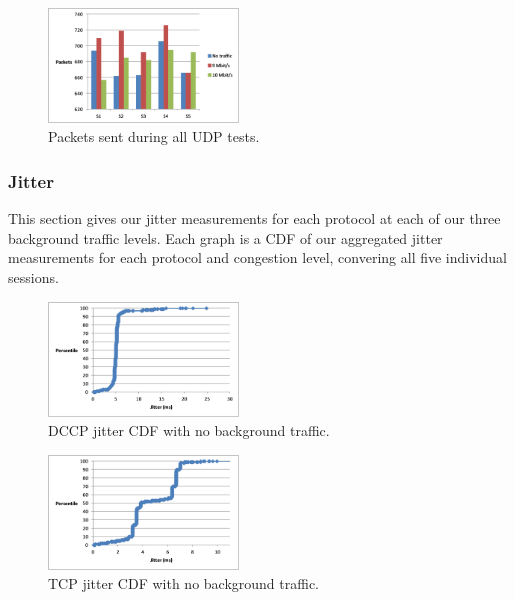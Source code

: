 \begin{figure}[!h]
   \centering
      \includegraphics[width=0.45\textwidth]{pics/udp_sent}
   \caption{Packets sent during all UDP tests.}
\label{fig:udp_sent}
\end{figure}

\subsubsection{Jitter}

This section gives our jitter measurements for each protocol at each of our
three background traffic levels. Each graph is a CDF of our aggregated jitter
measurements for each protocol and congestion level, convering all five
individual sessions.

\begin{figure}[!h]
   \centering
      \includegraphics[width=0.45\textwidth]{pics/dccp_none_jitter}
   \caption{DCCP jitter CDF with no background traffic.}
\label{fig:dccp_none_jitter}
\end{figure}

\begin{figure}[!h]
   \centering
      \includegraphics[width=0.45\textwidth]{pics/tcp_none_jitter}
   \caption{TCP jitter CDF with no background traffic.}
\label{fig:tcp_none_jitter}
\end{figure}


